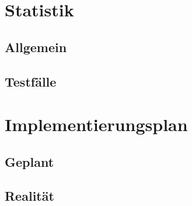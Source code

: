 \documentclass[a4paper,12pt]{article}
\begin{document}
\section{Statistik}
\subsection{Allgemein}
\subsection{Testfälle}


\clearpage

\section{Implementierungsplan}
\subsection{Geplant}


\subsection{Realität}

\clearpage
\end{document}

